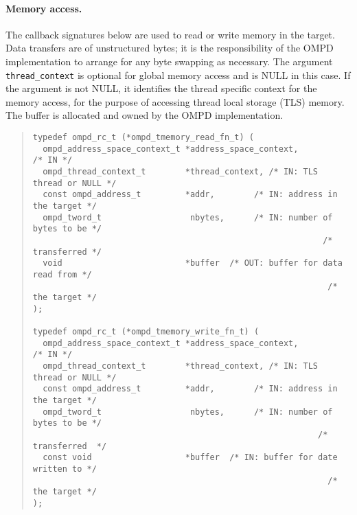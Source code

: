 
\paragraph{Memory access.}
The callback signatures below are used to read or write memory in the target.
Data transfers are of unstructured bytes; it is the responsibility
of the OMPD implementation to arrange for any byte swapping as necessary.
The argument \texttt{thread\_context} is optional for global memory access
and is NULL in this case. 
If the argument is not NULL, it identifies the thread specific context
for the memory access, for the purpose of accessing thread local
storage (TLS) memory.
The buffer is allocated and owned by the OMPD implementation.
\begin{quote}
\begin{lstlisting}
typedef ompd_rc_t (*ompd_tmemory_read_fn_t) (
  ompd_address_space_context_t *address_space_context,              /* IN */
  ompd_thread_context_t        *thread_context, /* IN: TLS thread or NULL */
  const ompd_address_t         *addr,        /* IN: address in the target */
  ompd_tword_t                  nbytes,      /* IN: number of bytes to be */
                                                           /* transferred */
  void                         *buffer  /* OUT: buffer for data read from */
                                                            /* the target */
);

typedef ompd_rc_t (*ompd_tmemory_write_fn_t) (
  ompd_address_space_context_t *address_space_context,              /* IN */
  ompd_thread_context_t        *thread_context, /* IN: TLS thread or NULL */
  const ompd_address_t         *addr,        /* IN: address in the target */
  ompd_tword_t                  nbytes,      /* IN: number of bytes to be */
                                                          /* transferred  */
  const void                   *buffer  /* IN: buffer for date written to */
                                                            /* the target */
);
\end{lstlisting}
\end{quote}

